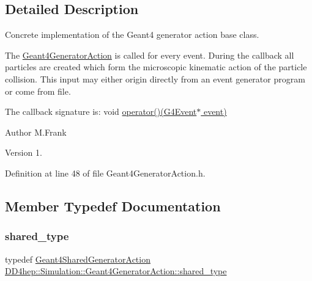 \subsection{Detailed Description}
Concrete implementation of the Geant4 generator action base class. 

The \hyperlink{class_d_d4hep_1_1_simulation_1_1_geant4_generator_action}{Geant4\+Generator\+Action} is called for every event. During the callback all particles are created which form the microscopic kinematic action of the particle collision. This input may either origin directly from an event generator program or come from file.

The callback signature is\+: void \hyperlink{class_d_d4hep_1_1_simulation_1_1_geant4_generator_action_ac5a1d2335a19e3f9d555081199e01801}{operator()(\+G4\+Event$\ast$ event)}

\begin{DoxyAuthor}{Author}
M.\+Frank 
\end{DoxyAuthor}
\begin{DoxyVersion}{Version}
1. 
\end{DoxyVersion}


Definition at line 48 of file Geant4\+Generator\+Action.\+h.



\subsection{Member Typedef Documentation}
\hypertarget{class_d_d4hep_1_1_simulation_1_1_geant4_generator_action_a21b579b261763b82cb86a001c8502c65}{}\label{class_d_d4hep_1_1_simulation_1_1_geant4_generator_action_a21b579b261763b82cb86a001c8502c65} 
\subsubsection{\texorpdfstring{shared\+\_\+type}{shared\_type}}
{\footnotesize\ttfamily typedef \hyperlink{class_d_d4hep_1_1_simulation_1_1_geant4_shared_generator_action}{Geant4\+Shared\+Generator\+Action} \hyperlink{class_d_d4hep_1_1_simulation_1_1_geant4_generator_action_a21b579b261763b82cb86a001c8502c65}{D\+D4hep\+::\+Simulation\+::\+Geant4\+Generator\+Action\+::shared\+\_\+type}}




